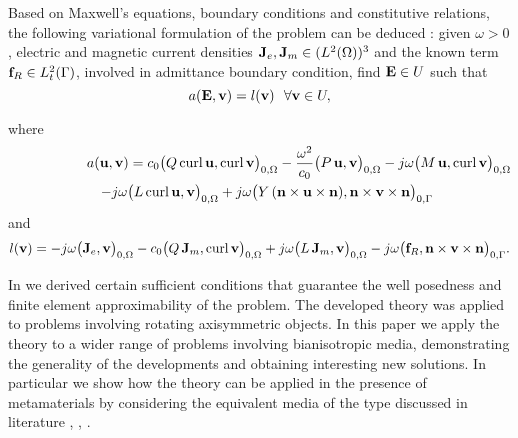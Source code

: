 Based on Maxwell's equations, boundary conditions and constitutive relations, 
the following variational formulation of the problem can be deduced \cite{bianisotropi_m3as}:
given $\omega>0$, 
  electric and magnetic current densities ${\bf J}_e, {\bf J}_m \in (L^2(\Omega))^3$ 
  and the known term ${\bf f}_R \in L^2_t(\Gamma)$, involved in admittance boundary condition, 
  find ${\bf E} \in U$ such that
  \begin{equation} \label{eq:variationalprob}
    a({\bf E},{\bf v}) = l({\bf v}) \ \ \forall {\bf v} \in U, 
  \end{equation}

\noindent
where
%
\begin{eqnarray} \label{eq:sesquilinear}
  \lefteqn{
    a({\bf u}, {\bf v})
    =
    c_0 
    \big(
      Q \, \mathrm{curl} \, {\bf u}, 
      \mathrm{curl} \, {\bf v}
    \big)_{0,\Omega}
    -
    \frac{\omega^2}{c_0} 
    \big( 
      P \, {\bf u},
      {\bf v}
    \big)_{0,\Omega}
    -
    j \omega
    \big( 
      M \, {\bf u},
      \mathrm{curl} \, {\bf v}
    \big)_{0,\Omega}
  }
  & &
  \nonumber
  \\
  & &
  -
  j \omega
  \big( 
    L \, \mathrm{curl} \, {\bf u},
    {\bf v}
  \big)_{0,\Omega}
  +
  j \omega 
  \big(
    Y \, ({\bf n} \times {\bf u} \times {\bf n}),
    {\bf n} \times {\bf v} \times {\bf n}
  \big)_{0,\Gamma}
\end{eqnarray}
%
and
%
\begin{equation} \label{antilinear}
  l({\bf v})
  =
  -
  j \omega 
  \big(
    {\bf J}_e, {\bf v}
  \big)_{0,\Omega}
  -
  c_0
  \big(
    Q \, {\bf J}_m, \mathrm{curl} \, {\bf v}
  \big)_{0,\Omega}
  +
  j \omega 
  \big(
    L \, {\bf J}_m,
    {\bf v}
  \big)_{0,\Omega}
  -
  j \omega 
  \big(
    {\bf f}_R,{\bf n} \times {\bf v} \times {\bf n}
  \big)_{0,\Gamma}.
\end{equation}
%

In \cite{kalarickel2020well} we derived certain sufficient conditions that 
guarantee the well posedness and finite element approximability of the problem.
The developed theory was applied to problems involving rotating axisymmetric objects.
In this paper we apply the theory to a wider range of problems involving bianisotropic media, 
demonstrating the generality of the developments and obtaining interesting new solutions.
In particular we show how the theory can be applied in the presence of metamaterials by 
considering the equivalent media of the type discussed in literature 
\cite{pendry2016acsphotonics}, \cite{wujaggard}, \cite{alottocodecasa}.

